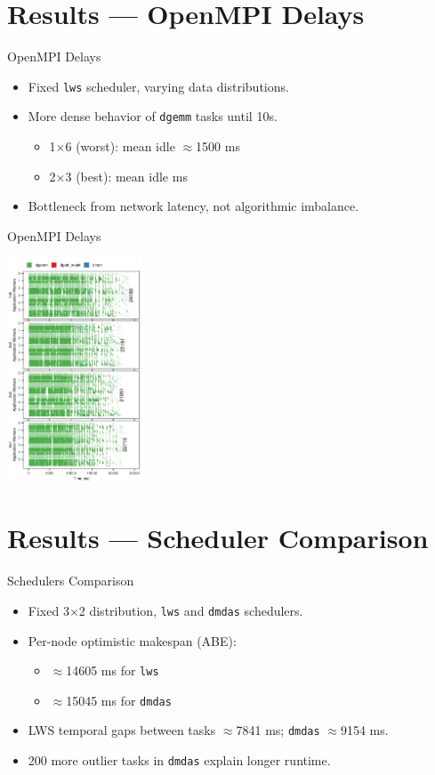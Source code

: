 \documentclass[12pt,xcolor=dvipsnames,presentation,aspectratio=169]{beamer}
\begin{document}
{\section{Results — OpenMPI Delays}
\label{sec:org31a2bd7}
\begin{frame}[label={sec:org0452a6e},fragile]{OpenMPI Delays}
 \begin{itemize}
\item Fixed \texttt{lws} scheduler, varying data distributions.
\item More dense behavior of \texttt{dgemm} tasks until 10s.
\begin{itemize}
\item 1×6 (worst): mean idle \(\approx\)1500 ms
\item 2×3 (best): mean idle  ms
\end{itemize}
\item Bottleneck from network latency, not algorithmic imbalance.
\end{itemize}
\end{frame}
\begin{frame}[label={sec:orgc23ae19}]{OpenMPI Delays}
\begin{center}
\includegraphics[width=0.3\textwidth]{../img/lws-all_pq-traces.pdf}
\end{center}
\end{frame}
\section{Results — Scheduler Comparison}
\label{sec:org159c3df}
\begin{frame}[label={sec:orgaa7835d},fragile]{Schedulers Comparison}
 \begin{itemize}
\item Fixed 3×2 distribution, \texttt{lws} and \texttt{dmdas} schedulers.
\item Per-node optimistic makespan (ABE):
\begin{itemize}
\item \(\approx\)14605 ms for \texttt{lws}
\item \(\approx\)15045 ms for \texttt{dmdas}
\end{itemize}
\item LWS temporal gaps between tasks \(\approx\)7841 ms; \texttt{dmdas} \(\approx\)9154 ms.
\item 200 more outlier tasks in \texttt{dmdas} explain longer runtime.
\end{itemize}


\end{frame}}
\end{document}

